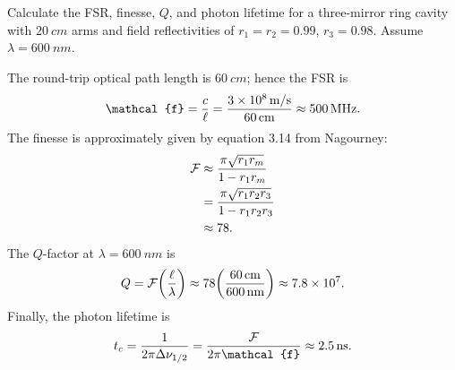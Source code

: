 \documentclass{article}
\newcounter{problem}
\numberwithin{equation}{problem}
\newcommand{\tx}[1]{\textnormal{#1}}
\newcommand{\eff}{\mathcal{f}}
\theoremstyle{definition}
\theoremstyle{remark}
\begin{document}
\begin{problem}[Problem 3][Nagourney 3.3] \label{ring_cavity}

\begin{problemstatement}
Calculate the FSR, finesse, $Q$, and photon lifetime for a three-mirror ring cavity with $\SI{20}{cm}$ arms and field reflectivities of $r_1 = r_2 = 0.99$, $r_3= 0.98$.  Assume $\lambda = \SI{600}{nm}$.
\end{problemstatement}

The round-trip optical path length is $\SI{60}{cm}$; hence the FSR is
\[
\eff = \frac{c}{\ell} = \frac{\SI{3e8}{m/s}}{\SI{60}{cm}} \approx \SI{500}{MHz} \tx{.}
\]
The finesse is approximately given by equation 3.14 from Nagourney:
\begin{align*}
\mathcal{F} &\approx \frac{\pi \sqrt{r_1 r_m}}{1 - r_1 r_m} \\
&= \frac{\pi \sqrt{r_1 r_2 r_3}}{1 - r_1 r_2 r_3} \\
&\approx 78 \tx{.}
\end{align*}
The $Q$-factor at $\lambda = \SI{600}{nm}$ is 
\[
Q = \mathcal{F} \qty( \frac{\ell}{\lambda} ) \approx 78 \qty( \frac{\SI{60}{cm}}{\SI{600}{nm}} ) \approx \num{7.8e7} \tx{.}
\]
Finally, the photon lifetime is 
\[
t_c = \frac{1}{2\pi \Delta \nu_{1/2}} = \frac{\mathcal{F}}{2\pi \eff} \approx \SI{2.5}{ns} \tx{.}
\]

\end{problem}
\end{document}
